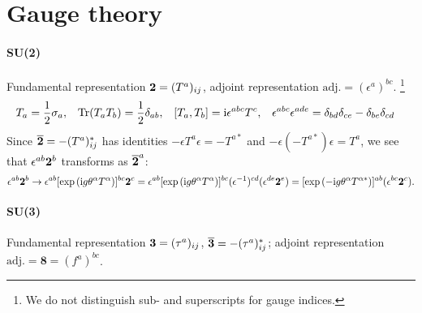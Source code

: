 \documentclass[CheatSheet]{subfiles}
\begin{document}
\summarystyle

\section{Gauge theory}
\paragraph{SU(2)}
Fundamental representation $\bm 2=(T^a)_{ij}$,
adjoint representation $\text{adj.}=(\epsilon^{a})^{bc}$.%
\footnote{We do not distinguish sub- and superscripts for gauge indices.}
\begin{align*}
 T_a &= \frac{1}{2} \sigma_a,
&
 \operatorname{\mathrm{Tr}}(T_a T_b) &= \frac{1}{2}\delta_{ab},
&
 [T_a, T_b] &= \mathrm{i} \epsilon^{abc}T^c,
&
 \epsilon^{abc}\epsilon^{ade} &= \delta_{bd}\delta_{ce} - \delta_{be}\delta_{cd}
\end{align*}
Since
$\overline{\bm 2}
  = -(T^a)^*_{ij}$
has identities
 $-\epsilon T^a \epsilon = -T^{a*}$ and
 $-\epsilon (-T^{a*}) \epsilon = T^a$,
%
we see that $\epsilon^{ab}\bm 2^b$ transforms as $\overline{\bm 2}^a$:
\begin{equation}
 \epsilon^{ab}\bm 2^b
\to
 \epsilon^{ab}[\exp\left(\mathrm{i} g \theta^\alpha T^\alpha\right)]^{bc}\bm 2^{c}
=
 \epsilon^{ab}[\exp\left(\mathrm{i} g \theta^\alpha T^\alpha\right)]^{bc}(\epsilon^{-1})^{cd}(\epsilon^{de}\bm 2^e)
=
 [\exp\left(-\mathrm{i} g \theta^\alpha T^{\alpha*}\right)]^{ab}(\epsilon^{bc}\bm 2^c).
\end{equation}

\paragraph{SU(3)}
Fundamental representation $\bm 3=(\tau^a)_{ij}$,
$\overline{\bm 3}=-(\tau^{a})^*_{ij}$;
adjoint representation $\text{adj.}=\bm{8}=(f^{a})^{bc}$.%
\end{document}
